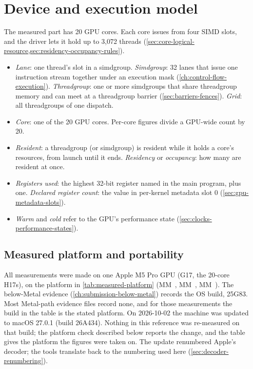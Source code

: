 \chapter{Device and execution model}\label{ch:device-execution-model}

The measured part has 20 GPU cores. Each core issues from four SIMD slots, and the driver lets it hold up to 3,072
threads (\cref{sec:core-logical-resource,sec:residency-occupancy-rules}).


\begin{itemize}
\item \emph{Lane}: one thread's slot in a simdgroup. \emph{Simdgroup}: 32 lanes that issue one instruction stream together under an
  execution mask (\cref{ch:control-flow-execution}). \emph{Threadgroup}: one or more simdgroups that share threadgroup memory and can meet at a
  threadgroup barrier (\cref{sec:barriers-fences}). \emph{Grid}: all threadgroups of one dispatch.
\item \emph{Core}: one of the 20 GPU cores. Per-core figures divide a GPU-wide count by 20.
\item \emph{Resident}: a threadgroup (or simdgroup) is resident while it holds a core's resources, from launch until it ends.
  \emph{Residency} or \emph{occupancy}: how many are resident at once.
\item \emph{Registers used}: the highest 32-bit register named in the main program, plus one. \emph{Declared register count}: the value in
  per-kernel metadata slot 0 (\cref{sec:gpu-metadata-slots}).
\item \emph{Warm} and \emph{cold} refer to the GPU's performance state (\cref{sec:clocks-performance-states}).
\end{itemize}

\section{Measured platform and portability}\label{sec:measured-part-software}

All measurements were made on one Apple M5 Pro GPU (G17, the 20-core H17s), on the platform in
\cref{tab:measured-platform} (MM~, MM~, MM~). The below-Metal evidence
(\cref{ch:submission-below-metal}) records the OS build, 25G83. Most Metal-path evidence files record none, and for
those measurements the build in the table is the stated platform.
On 2026-10-02 the machine was updated to macOS 27.0.1 (build 26A434). Nothing in this reference was re-measured on that
build; the platform check described below reports the change, and the table gives the platform the figures were taken on.
The update renumbered Apple's decoder; the tools translate back to the numbering used here (\cref{sec:decoder-renumbering}).

